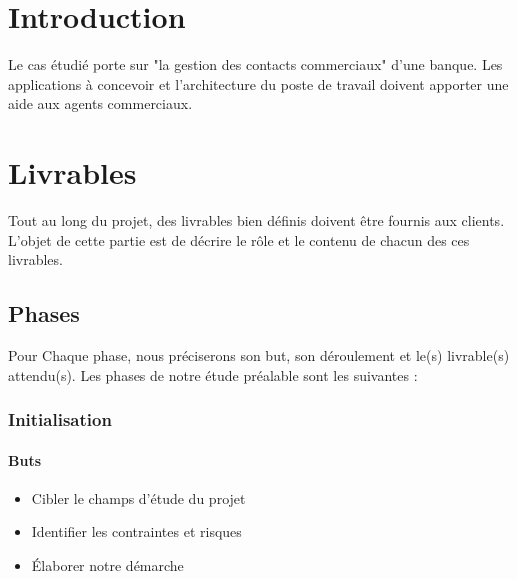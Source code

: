 \section{Introduction}

	Le cas étudié porte sur "la gestion des contacts commerciaux" d'une banque. Les applications à concevoir et l'architecture du poste de travail doivent apporter une aide aux agents commerciaux.

\section{Livrables}

Tout au long du projet, des livrables bien définis doivent être fournis aux clients. L’objet de cette partie est de décrire le rôle et le contenu de chacun des ces livrables.
\subsection{Phases}

Pour Chaque phase, nous préciserons son but, son déroulement et le(s) livrable(s) attendu(s). Les phases de notre étude préalable sont les suivantes :

\subsubsection{Initialisation}

\paragraph{Buts}
\begin{itemize}
    \item Cibler le champs d’étude du projet
    \item Identifier les contraintes et risques
    \item Élaborer notre démarche
\end{itemize}


